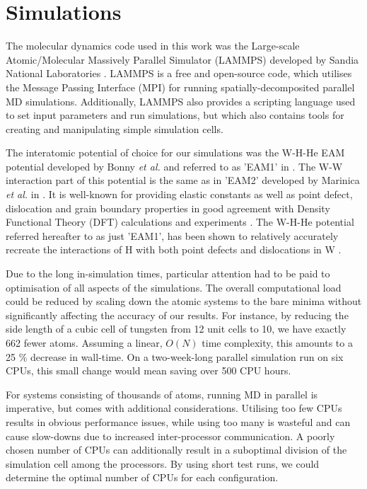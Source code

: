 \chapter{Simulations}

The molecular dynamics code used in this work was the Large-scale Atomic/Molecular Massively Parallel Simulator (LAMMPS) developed by Sandia National Laboratories \cite{lammpsMD}. 
LAMMPS is a free and open-source code, which utilises the Message Passing Interface (MPI) for running spatially-decomposited parallel MD simulations.
Additionally, LAMMPS also provides a scripting language used to set input parameters and run simulations, but which also contains tools for creating and manipulating simple simulation cells.    

The interatomic potential of choice for our simulations was the W-H-He EAM potential developed by Bonny \textit{et al.} and referred to as 'EAM1' in \cite{bonny2014binding}. 
The W-W interaction part of this potential is the same as in 'EAM2' developed by Marinica \textit{et al.} in \cite{marinica2013interatomic}. 
It is well-known for providing elastic constants as well as point defect, dislocation and grain boundary properties in good agreement with Density Functional Theory (DFT) calculations and experiments \cite{bonny2014many}. 
The W-H-He potential referred hereafter to as just 'EAM1', has been shown to relatively accurately recreate the interactions of H with both point defects and dislocations in W \cite{bonny2014binding, grigorev2015interaction}. 

Due to the long in-simulation times, particular attention had to be paid to optimisation of all aspects of the simulations.
The overall computational load could be reduced by scaling down the atomic systems to the bare minima without significantly affecting the accuracy of our results.
For instance, by reducing the side length of a cubic cell of tungsten from 12 unit cells to 10, we have exactly 662 fewer atoms. 
Assuming a linear, $O(N)$ time complexity, this amounts to a 25 \% decrease in wall-time.
On a two-week-long parallel simulation run on six CPUs, this small change would mean saving over 500 CPU hours. 

For systems consisting of thousands of atoms, running MD in parallel is imperative, but comes with additional considerations.  
Utilising too few CPUs results in obvious performance issues, while using too many is wasteful and can cause slow-downs due to increased inter-processor communication.
A poorly chosen number of CPUs can additionally result in a suboptimal division of the simulation cell among the processors. 
By using short test runs, we could determine the optimal number of CPUs for each configuration.

